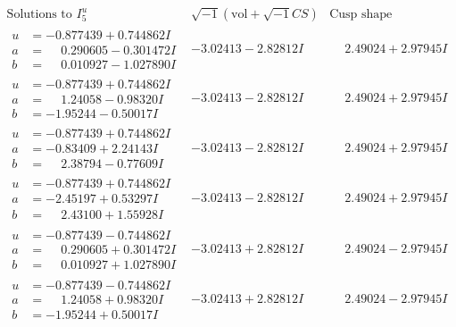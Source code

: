 \documentclass[1p]{elsarticle_modified}
\theoremstyle{definition}
\newcommand{\I}{\sqrt{-1}}
\begin{document}
$$\begin{array}{c|c|c}  
\text{Solutions to }I^u_{5}& \I (\text{vol} + \sqrt{-1}CS) & \text{Cusp shape}\\
 \hline 
\begin{aligned}
u &= -0.877439 + 0.744862 I \\
a &= \phantom{-}0.290605 - 0.301472 I \\
b &= \phantom{-}0.010927 - 1.027890 I\end{aligned}
 & -3.02413 - 2.82812 I & \phantom{-}2.49024 + 2.97945 I \\ \hline\begin{aligned}
u &= -0.877439 + 0.744862 I \\
a &= \phantom{-}1.24058 - 0.98320 I \\
b &= -1.95244 - 0.50017 I\end{aligned}
 & -3.02413 - 2.82812 I & \phantom{-}2.49024 + 2.97945 I \\ \hline\begin{aligned}
u &= -0.877439 + 0.744862 I \\
a &= -0.83409 + 2.24143 I \\
b &= \phantom{-}2.38794 - 0.77609 I\end{aligned}
 & -3.02413 - 2.82812 I & \phantom{-}2.49024 + 2.97945 I \\ \hline\begin{aligned}
u &= -0.877439 + 0.744862 I \\
a &= -2.45197 + 0.53297 I \\
b &= \phantom{-}2.43100 + 1.55928 I\end{aligned}
 & -3.02413 - 2.82812 I & \phantom{-}2.49024 + 2.97945 I \\ \hline\begin{aligned}
u &= -0.877439 - 0.744862 I \\
a &= \phantom{-}0.290605 + 0.301472 I \\
b &= \phantom{-}0.010927 + 1.027890 I\end{aligned}
 & -3.02413 + 2.82812 I & \phantom{-}2.49024 - 2.97945 I \\ \hline\begin{aligned}
u &= -0.877439 - 0.744862 I \\
a &= \phantom{-}1.24058 + 0.98320 I \\
b &= -1.95244 + 0.50017 I\end{aligned}
 & -3.02413 + 2.82812 I & \phantom{-}2.49024 - 2.97945 I \\ \hline\begin{aligned}

\end{aligned}
\end{array}$$
\end{document}
